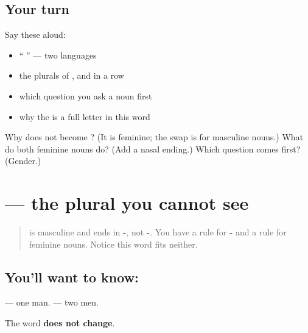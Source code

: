 \subsection*{Your turn}
Say these aloud:

\begin{itemize}
\raggedright
  \item \textquotedblleft{} \textquotedblright{} — two languages
  \item the plurals of \textbf{}, \textbf{} and \textbf{} in a row
  \item which question you ask a noun first
  \item why the \textbf{} is a full letter in this word
\end{itemize}

\begin{tcolorbox}[breakable,colback=teal!4,colframe=teal!35!black,title={Before you move on}]
Why does \textbf{} not become \textbf{}? (It is feminine; the swap is for masculine nouns.) What do both feminine nouns do? (Add a nasal ending.) Which question comes first? (Gender.)
\end{tcolorbox}
\section[\texorpdfstring{\hi{दो} \hi{आदमी} (do ādmī)}{दो आदमी (do ādmī)}]{  — the plural you cannot see}

\label{lesson:HI-C91-aadmi-unchanged}



\begin{quote}
\textbf{} is masculine and ends in \textbf{-}, not \textbf{-}. You have a rule for \textbf{-} and a rule for feminine nouns. Notice this word fits neither.
\end{quote}

\subsection*{You'll want to know:  }
\textbf{ } — one man. \textbf{ } — two men.

The word \textbf{does not change}.

